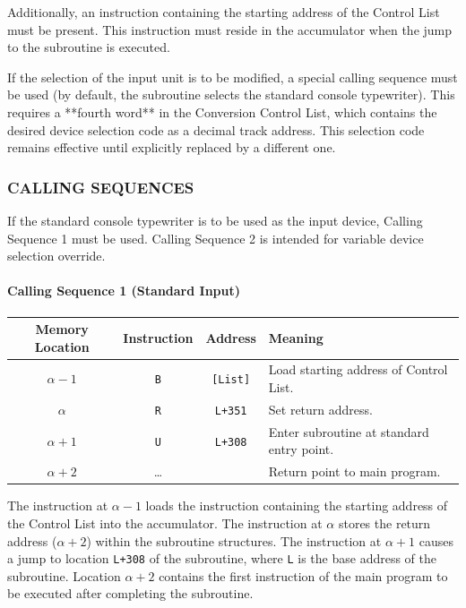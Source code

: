 Additionally, an instruction containing the starting address of the Control List must be present. This instruction must reside in the accumulator when the jump to the subroutine is executed.

If the selection of the input unit is to be modified, a special calling sequence must be used (by default, the subroutine selects the standard console typewriter). This requires a **fourth word** in the Conversion Control List, which contains the desired device selection code as a decimal track address. This selection code remains effective until explicitly replaced by a different one.

\subsubsection*{CALLING SEQUENCES}
If the standard console typewriter is to be used as the input device, Calling Sequence 1 must be used. Calling Sequence 2 is intended for variable device selection override.

\paragraph{Calling Sequence 1 (Standard Input)}
\begin{table}[h!]
\centering
\begin{tabularx}{\textwidth}{cccX}
\toprule
\textbf{Memory Location} & \textbf{Instruction} & \textbf{Address} & \textbf{Meaning} \\
\midrule
$\alpha-1$   & \texttt{B} & \texttt{[List]} & Load starting address of Control List. \\
$\alpha$     & \texttt{R} & \texttt{L+351}  & Set return address. \\
$\alpha+1$   & \texttt{U} & \texttt{L+308}  & Enter subroutine at standard entry point. \\
$\alpha+2$   & \dots      &                  & Return point to main program. \\
\bottomrule
\end{tabularx}
\end{table}
The instruction at $\alpha-1$ loads the instruction containing the starting address of the Control List into the accumulator. The instruction at $\alpha$ stores the return address ($\alpha+2$) within the subroutine structures. The instruction at $\alpha+1$ causes a jump to location \texttt{L+308} of the subroutine, where \texttt{L} is the base address of the subroutine. Location $\alpha+2$ contains the first instruction of the main program to be executed after completing the subroutine.

